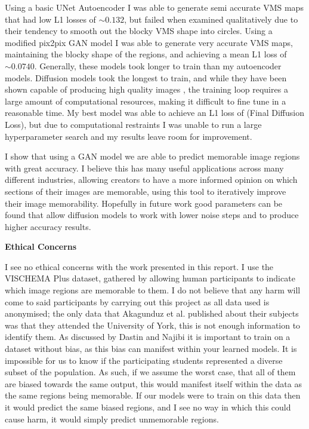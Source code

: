 \documentclass{UoYCSproject}
\begin{document}
Using a basic UNet Autoencoder I was able to generate semi accurate VMS maps that had low L1 losses of \(\sim 0.132\), but failed when examined qualitatively due to their tendency to smooth out the blocky VMS shape into circles.
Using a modified pix2pix GAN model \cite{isola2018imagetoimage} I was able to generate very accurate VMS maps, maintaining the blocky shape of the regions, and achieving a mean L1 loss of \(\sim 0.0740\). Generally, these models took longer to train than my autoencoder models.
Diffusion models took the longest to train, and while they have been shown capable of producing high quality images \cite{ramesh2022hierarchical, saharia2022photorealistic}, the training loop requires a large amount of computational resources, making it difficult to fine tune in a reasonable time. My best model was able to achieve an L1 loss of (Final Diffusion Loss), but due to computational restraints I was unable to run a large hyperparameter search and my results leave room for improvement.

I show that using a GAN model we are able to predict memorable image regions with great accuracy. I believe this has many useful applications across many different industries, allowing creators to have a more informed opinion on which sections of their images are memorable, using this tool to iteratively improve their image memorability. Hopefully in future work good parameters can be found that allow diffusion models to work with lower noise steps and to produce higher accuracy results.

\textbf{Ethical Concerns}

I see no ethical concerns with the work presented in this report. I use the VISCHEMA Plus dataset, gathered by allowing human participants to indicate which image regions are memorable to them. I do not believe that any harm will come to said participants by carrying out this project as all data used is anonymised; the only data that Akagunduz et al. published about their subjects was that they attended the University of York, this is not enough information to identify them. As discussed by Dastin \cite{dastin_2018} and Najibi \cite{najibi_2020} it is important to train on a dataset without bias, as this bias can manifest within your learned models. It is impossible for us to know if the participating students represented a diverse subset of the population. As such, if we assume the worst case, that all of them are biased towards the same output, this would manifest itself within the data as the same regions being memorable. If our models were to train on this data then it would predict the same biased regions, and I see no way in which this could cause harm, it would simply predict unmemorable regions.
\end{document}
